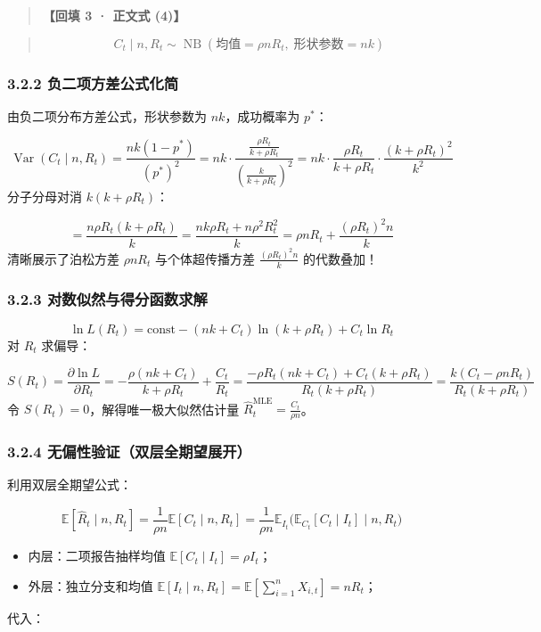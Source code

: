 \documentclass[11pt,a4paper]{ctexart}
\begin{document}
\begin{quote}\small\color{black!75}
\textbf{【回填 3 · 正文式 (4)】}
\end{quote}
\begin{quote}\small\color{black!75}
\begin{equation*}
C_t \mid n, R_t \sim \operatorname{NB}\!\left(\text{均值} = \rho n R_t, \; \text{形状参数} = nk\right) \tag{eq:nb\_thinning}
\end{equation*}
\end{quote}

\subsubsection{3.2.2 负二项方差公式化简}
由负二项分布方差公式，形状参数为 $nk$，成功概率为 $p^*$：

\[
\operatorname{Var}(C_t \mid n, R_t) = \frac{nk(1 - p^*)}{(p^*)^2} = nk \cdot \frac{\frac{\rho R_t}{k + \rho R_t}}{\left(\frac{k}{k + \rho R_t}\right)^2} = nk \cdot \frac{\rho R_t}{k + \rho R_t} \cdot \frac{(k + \rho R_t)^2}{k^2}
\]
分子分母对消 $k(k + \rho R_t)$：

\[
= \frac{n \rho R_t (k + \rho R_t)}{k} = \frac{nk \rho R_t + n \rho^2 R_t^2}{k} = \rho n R_t + \frac{(\rho R_t)^2 n}{k}
\]
清晰展示了泊松方差 $\rho n R_t$ 与个体超传播方差 $\frac{(\rho R_t)^2 n}{k}$ 的代数叠加！


\subsubsection{3.2.3 对数似然与得分函数求解}
\[
\ln L(R_t) = \text{const} - (nk + C_t) \ln(k + \rho R_t) + C_t \ln R_t
\]
对 $R_t$ 求偏导：

\[
S(R_t) = \frac{\partial \ln L}{\partial R_t} = -\frac{\rho(nk + C_t)}{k + \rho R_t} + \frac{C_t}{R_t} = \frac{-\rho R_t(nk + C_t) + C_t(k + \rho R_t)}{R_t(k + \rho R_t)} = \frac{k(C_t - \rho n R_t)}{R_t(k + \rho R_t)}
\]
令 $S(R_t) = 0$，解得唯一极大似然估计量 $\widehat{R}_t^{\text{MLE}} = \frac{C_t}{\rho n}$。


\subsubsection{3.2.4 无偏性验证（双层全期望展开）}
利用双层全期望公式：

\[
\mathbb{E}[\widehat{R}_t \mid n, R_t] = \frac{1}{\rho n} \mathbb{E}[C_t \mid n, R_t] = \frac{1}{\rho n} \mathbb{E}_{I_t}\Big( \mathbb{E}_{C_t}[C_t \mid I_t] \;\Big|\; n, R_t \Big)
\]
\begin{itemize}[leftmargin=2em, itemsep=2pt, parsep=0pt]
\item 内层：二项报告抽样均值 $\mathbb{E}[C_t \mid I_t] = \rho I_t$；
\item 外层：独立分支和均值 $\mathbb{E}[I_t \mid n, R_t] = \mathbb{E}\left[\sum_{i=1}^n X_{i,t}\right] = n R_t$；
\end{itemize}
代入：
\end{document}
